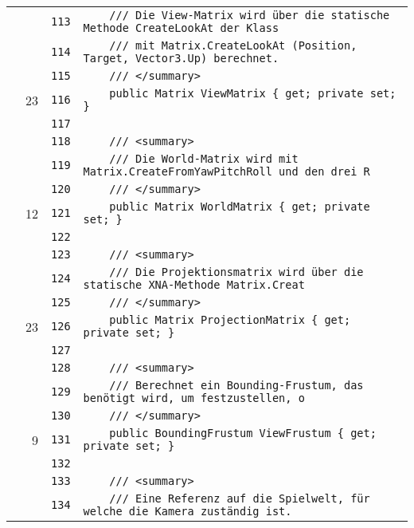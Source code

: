 \documentclass[a4paper,10pt]{article}
\begin{document}
\begin{longtable}[l]{lrrl}
\cellcolor{gray} &  & \verb~113~ & \verb~    /// Die View-Matrix wird über die statische Methode CreateLookAt der Klass~\\
\cellcolor{gray} &  & \verb~114~ & \verb~    /// mit Matrix.CreateLookAt (Position, Target, Vector3.Up) berechnet.~\\
\cellcolor{gray} &  & \verb~115~ & \verb~    /// </summary>~\\
\cellcolor{green} & 23 & \verb~116~ & \verb~    public Matrix ViewMatrix { get; private set; }~\\
\cellcolor{gray} &  & \verb~117~ & \verb~~\\
\cellcolor{gray} &  & \verb~118~ & \verb~    /// <summary>~\\
\cellcolor{gray} &  & \verb~119~ & \verb~    /// Die World-Matrix wird mit Matrix.CreateFromYawPitchRoll und den drei R~\\
\cellcolor{gray} &  & \verb~120~ & \verb~    /// </summary>~\\
\cellcolor{green} & 12 & \verb~121~ & \verb~    public Matrix WorldMatrix { get; private set; }~\\
\cellcolor{gray} &  & \verb~122~ & \verb~~\\
\cellcolor{gray} &  & \verb~123~ & \verb~    /// <summary>~\\
\cellcolor{gray} &  & \verb~124~ & \verb~    /// Die Projektionsmatrix wird über die statische XNA-Methode Matrix.Creat~\\
\cellcolor{gray} &  & \verb~125~ & \verb~    /// </summary>~\\
\cellcolor{green} & 23 & \verb~126~ & \verb~    public Matrix ProjectionMatrix { get; private set; }~\\
\cellcolor{gray} &  & \verb~127~ & \verb~~\\
\cellcolor{gray} &  & \verb~128~ & \verb~    /// <summary>~\\
\cellcolor{gray} &  & \verb~129~ & \verb~    /// Berechnet ein Bounding-Frustum, das benötigt wird, um festzustellen, o~\\
\cellcolor{gray} &  & \verb~130~ & \verb~    /// </summary>~\\
\cellcolor{green} & 9 & \verb~131~ & \verb~    public BoundingFrustum ViewFrustum { get; private set; }~\\
\cellcolor{gray} &  & \verb~132~ & \verb~~\\
\cellcolor{gray} &  & \verb~133~ & \verb~    /// <summary>~\\
\cellcolor{gray} &  & \verb~134~ & \verb~    /// Eine Referenz auf die Spielwelt, für welche die Kamera zuständig ist.~\\

\end{longtable}
\end{document}
